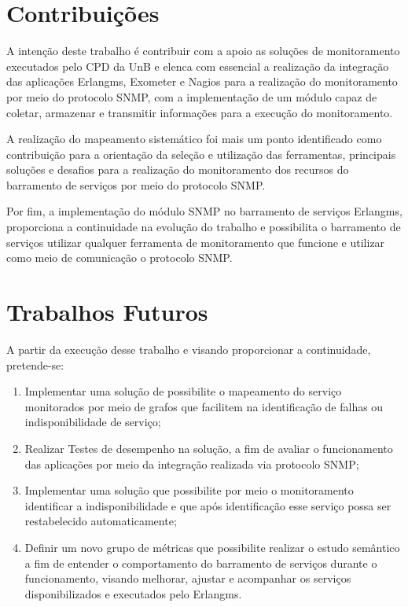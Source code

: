 \section{Contribuições}

A intenção deste trabalho é contribuir com a apoio as soluções de monitoramento executados pelo \acrshort{CPD} da \acrshort{UnB} e elenca com essencial a realização da integração das aplicações Erlangms, Exometer e Nagios\textsuperscript{\textregistered} para a realização do monitoramento por meio do protocolo \acrshort{SNMP}, com a implementação de um módulo capaz de coletar, armazenar e transmitir informações para a execução do monitoramento.

A realização do mapeamento sistemático foi mais um ponto identificado como contribuição para a orientação da seleção e utilização das ferramentas, principais soluções e desafios para a realização do monitoramento dos recursos do barramento de serviços por meio do protocolo \acrshort{SNMP}.

Por fim, a implementação do módulo \acrshort{SNMP} no barramento de serviços Erlangms, proporciona a continuidade na evolução do trabalho \cite{Agilar} e possibilita o barramento de serviços utilizar qualquer ferramenta de monitoramento que funcione e utilizar como meio de comunicação o protocolo \acrshort{SNMP}.




\section{Trabalhos Futuros}

A partir da execução desse trabalho e visando proporcionar a continuidade, pretende-se:

\begin{enumerate}
    \item Implementar uma solução de possibilite o mapeamento do serviço monitorados por meio de grafos que facilitem na identificação de falhas ou indisponibilidade de serviço;
    \item Realizar Testes de desempenho na solução, a fim de avaliar o funcionamento das aplicações por meio da integração realizada via protocolo \acrshort{SNMP};
    \item Implementar uma solução que possibilite por meio o monitoramento identificar a indisponibilidade e que após identificação esse serviço possa ser restabelecido automaticamente;
    \item Definir um novo grupo de métricas que possibilite realizar o estudo semântico a fim de entender o comportamento do barramento de serviços durante o funcionamento, visando melhorar, ajustar e acompanhar os serviços disponibilizados e executados pelo Erlangms.
\end{enumerate}

